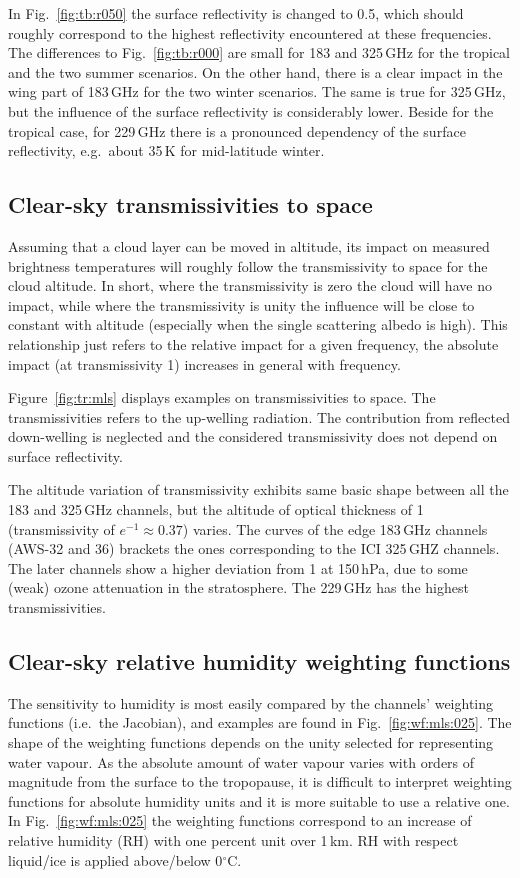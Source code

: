 \documentclass[12pt]{article}
\begin{document}
In Fig.~\ref{fig:tb:r050} the surface reflectivity is changed to 0.5, which
should roughly correspond to the highest reflectivity encountered at these
frequencies. The differences to Fig.~\ref{fig:tb:r000}  are small for 183 and
325\,GHz for the tropical and the two summer scenarios. On the other hand,
there is a clear impact in the wing part of 183\,GHz for the two winter
scenarios. The same is true for 325\,GHz, but the influence of the surface
reflectivity is considerably lower.  Beside for the tropical case, for
229\,GHz there is a pronounced dependency of the surface reflectivity, e.g.\
about 35\,K for mid-latitude winter.


\subsection{Clear-sky transmissivities to space}
%
Assuming that a cloud layer can be moved in altitude, its impact on measured
brightness temperatures will roughly follow the transmissivity to space for the
cloud altitude. In short, where the transmissivity is zero the cloud will have
no impact, while where the transmissivity is unity the influence will be close
to constant with altitude (especially when the single scattering albedo is
high). This relationship just refers to the relative impact for a
given frequency, the absolute impact (at transmissivity 1) increases in general
with frequency. 

Figure~\ref{fig:tr:mls} displays examples on transmissivities to space. The
transmissivities refers to the up-welling radiation. The contribution from
reflected down-welling is neglected and the considered transmissivity does not
depend on surface reflectivity.

The altitude variation of transmissivity exhibits same basic shape between all
the 183 and 325\,GHz channels, but the altitude of optical thickness of 1
(transmissivity of $e^{-1}\approx0.37$) varies. The curves of the edge 183\,GHz
channels (AWS-32 and 36) brackets the ones corresponding to the ICI 325\,GHZ
channels. The later channels show a higher deviation from 1 at 150\,hPa, due to
some (weak) ozone attenuation in the stratosphere. The 229\,GHz has the highest
transmissivities.


\subsection{Clear-sky relative humidity weighting functions}
%
The sensitivity to humidity is most easily compared by the channels' weighting
functions (i.e.\ the Jacobian), and examples are found in
Fig.~\ref{fig:wf:mls:025}. The shape of the weighting functions depends on the
unity selected for representing water vapour. As the absolute amount of water
vapour varies with orders of magnitude from the surface to the tropopause, it
is difficult to interpret weighting functions for absolute humidity units and
it is more suitable to use a relative one. In Fig.~\ref{fig:wf:mls:025} the
weighting functions correspond to an increase of relative humidity (RH) with one
percent unit over 1\,km. RH with respect liquid/ice is applied above/below
0$^\circ$C.
\end{document}
